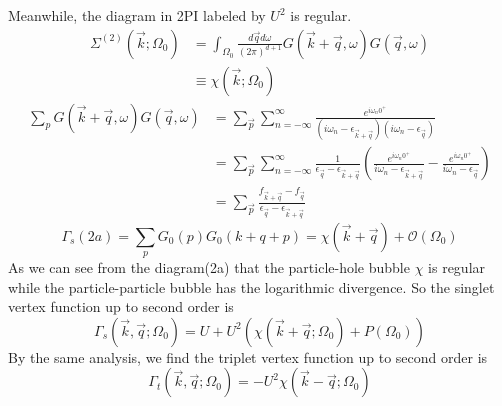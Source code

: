 \documentclass[12pt]{article}
\numberwithin{equation}{section}
\begin{document}
Meanwhile, the diagram in 2PI labeled by $U^2$ is regular. 
\begin{equation}
	\begin{aligned}
	\Sigma^{(2)}\left(\vec{k} ; \Omega_{0}\right) &=\int_{\Omega_{0}} \frac{d \vec{q} d \omega}{(2 \pi)^{d+1}} G(\vec{k}+\vec{q}, \omega) G(\vec{q}, \omega) \\
	& \equiv \chi\left(\vec{k} ; \Omega_{0}\right)
	\end{aligned}
	\end{equation}
\begin{equation}
	\begin{aligned}
	\sum_{p}G(\vec{k}+\vec{q},\omega)G(\vec{q},\omega) & =\sum_{\vec{p}}\sum_{n=-\infty}^{\infty}\frac{e^{i \omega_{n} 0^{+}}}{\left(i \omega_{n}-\epsilon_{\vec{k}+\vec{q}} \right)\left(i \omega_{n}-\epsilon_{\vec{q}}\right)}\\
	& =\sum_{\vec{p}}\sum_{n=-\infty}^{\infty}\frac{1}{\epsilon_{\vec{q}}-\epsilon_{\vec{k}+\vec{q}}}\left(\frac{e^{i\omega_n0^+}}{i\omega_n-\epsilon_{\vec{k}+\vec{q}}}-\frac{e^{i\omega_n0^+}}{i\omega_n-\epsilon_{\vec{q}}}\right)\\
	& =\sum_{\vec{p}}\frac{f_{\vec{k}+\vec{q}}-f_{\vec{q}}}{\epsilon_{\vec{q}}-\epsilon_{\vec{k}+\vec{q}}}
	\end{aligned}
\end{equation}
\begin{equation}
	\Gamma_{s}(2 a)=\sum_{p} G_{0}(p) G_{0}(k+q+p)=\chi(\vec{k}+\vec{q})+\mathcal{O}\left(\Omega_{0}\right)
	\end{equation}
As we can see from the diagram(2a) that the particle-hole bubble $\chi$ is regular while the particle-particle bubble has the logarithmic divergence. 
So the singlet vertex function up to second order is 
\begin{equation}
	\Gamma_{s}\left(\vec{k}, \vec{q} ; \Omega_{0}\right)=U+ U^2(\chi(\vec{k}+\vec{q} ; \Omega_{0})+P\left(\Omega_{0}\right))
	\end{equation}
By the same analysis, we find the triplet vertex function up to second order is 
\begin{equation}
	\Gamma_{t}\left(\vec{k}, \vec{q} ; \Omega_{0}\right)=-U^2\chi(\vec{k}-\vec{q};\Omega_0)
	\end{equation}
\end{document}
